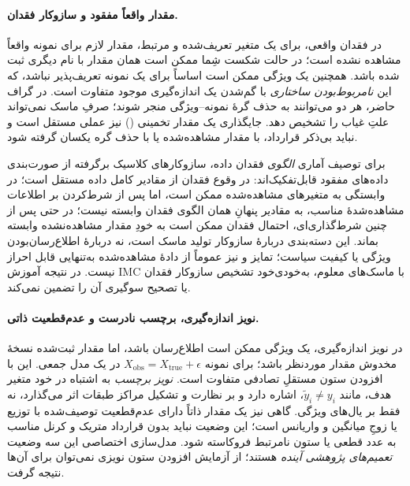 \paragraph{مقدار واقعاً مفقود و سازوکار فقدان.}
در فقدان واقعی، برای یک متغیر
تعریف‌شده و مرتبط، مقدار لازم برای
نمونه واقعاً مشاهده نشده است؛
در حالت شکست شِما ممکن است همان
مقدار با نام دیگری ثبت شده باشد.
همچنین یک ویژگی ممکن است اساساً
برای یک نمونه تعریف‌پذیر نباشد،
که این \emph{نامربوط‌بودن ساختاری}
با گم‌شدن یک اندازه‌گیری موجود
متفاوت است. در گراف حاضر، هر دو
می‌توانند به حذف گرهٔ نمونه--ویژگی
منجر شوند؛ صرفِ ماسک نمی‌تواند
علتِ غیاب را تشخیص دهد.
جایگذاری یک مقدار تخمینی
() نیز عملی مستقل
است و نباید بی‌ذکر قرارداد، با
مقدار مشاهده‌شده یا با حذف گره
یکسان گرفته شود.

برای توصیف آماری \emph{الگوی}
فقدان داده، سازوکارهای کلاسیک
برگرفته از صورت‌بندی داده‌های مفقود
\cite{Rubin1976MissingData}
قابل‌تفکیک‌اند: در 
وقوع فقدان از مقادیر کامل داده
مستقل است؛ در  وابستگی
به متغیرهای مشاهده‌شده ممکن است،
اما پس از شرط‌کردن بر اطلاعات
مشاهده‌شدهٔ مناسب، به مقادیر
پنهانِ همان الگوی فقدان وابسته نیست؛
در  حتی پس از چنین
شرط‌گذاری‌ای، احتمال فقدان ممکن است
به خودِ مقدار مشاهده‌نشده وابسته بماند.
این دسته‌بندی دربارهٔ سازوکار
تولید ماسک است، نه دربارهٔ
اطلاع‌رسان‌بودن ویژگی یا کیفیت
سیاست؛ تمایز  و
 نیز عموماً از دادهٔ
مشاهده‌شده به‌تنهایی قابل احراز
نیست. در نتیجه آموزش IMC با
ماسک‌های معلوم، به‌خودی‌خود
تشخیص سازوکار فقدان یا تصحیح
سوگیری آن را تضمین نمی‌کند.

\paragraph{نویز اندازه‌گیری، برچسب نادرست و عدم‌قطعیت ذاتی.}
در نویز اندازه‌گیری، یک ویژگی ممکن است
اطلاع‌رسان باشد، اما مقدار ثبت‌شده
نسخهٔ مخدوش مقدار موردنظر باشد؛
برای نمونه $X_{\mathrm{obs}}=X_{\mathrm{true}}
+\epsilon$ در یک مدل جمعی.
این با افزودن ستون مستقلِ تصادفی
متفاوت است. \emph{نویز برچسب} به
اشتباه در خود متغیر هدف، مانند
$\widetilde y_i\ne y_i$، اشاره
دارد و بر نظارت و تشکیل مراکز
طبقات اثر می‌گذارد، نه فقط بر
یال‌های ویژگی. گاهی نیز یک مقدار
ذاتاً دارای عدم‌قطعیت توصیف‌شده
با توزیع یا زوجِ میانگین و واریانس
است؛ این وضعیت نباید بدون قرارداد
متریک و کرنل مناسب به عدد قطعی
یا ستون نامرتبط فروکاسته شود.
مدل‌سازی اختصاصی این سه وضعیت
\emph{تعمیم‌های پژوهشی آینده}
هستند؛ از آزمایش افزودن ستون نویزی
نمی‌توان برای آن‌ها نتیجه گرفت.


